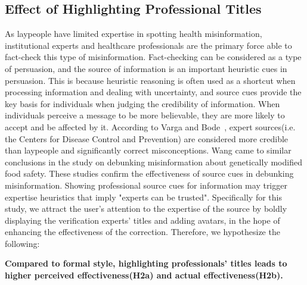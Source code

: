 \subsection{Effect of Highlighting Professional Titles}
As laypeople have limited expertise in spotting health misinformation, institutional experts and healthcare professionals are the primary force able to fact-check this type of misinformation\cite[]{bautista2021healthcare}.
Fact-checking can be considered as a type of persuasion\cite[]{garrett2013undermining}, and the source of information is an important heuristic cues in persuasion\cite[]{mondak1993public}.
This is because heuristic reasoning is often used as a shortcut when processing information and dealing with uncertainty\cite[]{kahan2010fears}, and source cues provide the key basis for individuals when judging the credibility of information. 
When individuals perceive a message to be more believable, they are more likely to accept and be affected by it\cite{austin1994source}.
According to Varga and Bode~\cite[]{vraga2017using}, expert sources(i.e. the Centers for Disease Control and Prevention) are considered more credible than laypeople and significantly correct misconceptions.
Wang\cite[]{wang2021debunking} came to similar conclusions in the study on debunking misinformation about genetically modified food safety. These studies confirm the effectiveness of source cues in debunking misinformation.
Showing professional source cues for information may trigger expertise heuristics that imply "experts can be trusted"\cite[]{sundar2008main}.
Specifically for this study, we attract the user's attention to the expertise of the source by boldly displaying the verification experts' titles and adding avatars, in the hope of enhancing the effectiveness of the correction.
Therefore, we hypothesize the following:

\textbf{Compared to formal style, highlighting professionals' titles leads to higher perceived effectiveness(H2a) and actual effectiveness(H2b).}
